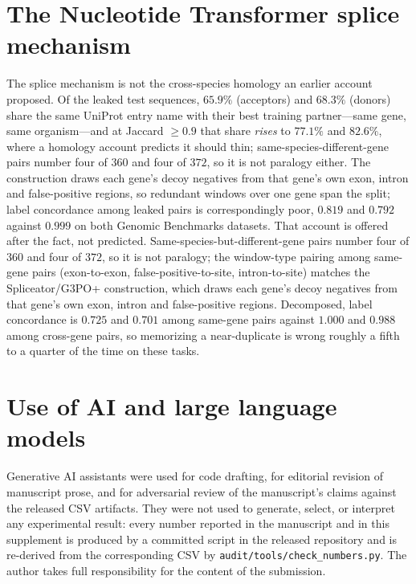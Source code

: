 \documentclass[11pt,a4paper]{article}
\begin{document}
\section{The Nucleotide Transformer splice mechanism}\label{sec:s-splice}
The splice mechanism is not the cross-species homology an earlier account proposed. Of the leaked test sequences, $65.9\%$ (acceptors) and $68.3\%$ (donors) share the same UniProt entry name with their best training partner---same gene, same organism---and at Jaccard $\ge0.9$ that share \emph{rises} to $77.1\%$ and $82.6\%$, where a homology account predicts it should thin; same-species-different-gene pairs number four of $360$ and four of $372$, so it is not paralogy either. The construction draws each gene's decoy negatives from that gene's own exon, intron and false-positive regions, so redundant windows over one gene span the split; label concordance among leaked pairs is correspondingly poor, $0.819$ and $0.792$ against $0.999$ on both Genomic Benchmarks datasets. That account is offered after the fact, not predicted. Same-species-but-different-gene pairs number four of $360$ and four of $372$, so it is not paralogy; the window-type pairing among same-gene pairs (exon-to-exon, false-positive-to-site, intron-to-site) matches the Spliceator/G3PO+ construction, which draws each gene's decoy negatives from that gene's own exon, intron and false-positive regions. Decomposed, label concordance is $0.725$ and $0.701$ among same-gene pairs against $1.000$ and $0.988$ among cross-gene pairs, so memorizing a near-duplicate is wrong roughly a fifth to a quarter of the time on these tasks.

\section{Use of AI and large language models}\label{sec:s-ai}
Generative AI assistants were used for code drafting, for editorial revision of manuscript prose,
and for adversarial review of the manuscript's claims against the released CSV artifacts. They were
not used to generate, select, or interpret any experimental result: every number reported in the
manuscript and in this supplement is produced by a committed script in the released repository and
is re-derived from the corresponding CSV by \texttt{audit/tools/check\_numbers.py}. The author takes
full responsibility for the content of the submission.


\end{document}
